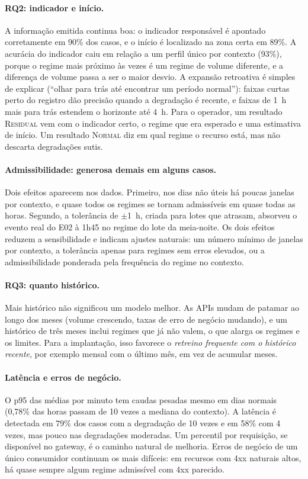 \documentclass[sigconf,nonacm]{acmart}
\newcommand{\Normal}{\textsc{Normal}\xspace}
\newcommand{\Residual}{\textsc{Residual}\xspace}
\begin{document}
\paragraph{RQ2: indicador e início.} A informação emitida continua boa: o indicador responsável é apontado corretamente em 90\% dos casos, e o início é localizado na zona certa em 89\%. A acurácia do indicador caiu em relação a um perfil único por contexto (93\%), porque o regime mais próximo às vezes é um regime de volume diferente, e a diferença de volume passa a ser o maior desvio. A expansão retroativa é simples de explicar (``olhar para trás até encontrar um período normal''): faixas curtas perto do registro dão precisão quando a degradação é recente, e faixas de 1~h mais para trás estendem o horizonte até 4~h. Para o operador, um resultado \Residual vem com o indicador certo, o regime que era esperado e uma estimativa de início. Um resultado \Normal diz em qual regime o recurso está, mas não descarta degradações sutis.

\paragraph{Admissibilidade: generosa demais em alguns casos.} Dois efeitos aparecem nos dados. Primeiro, nos dias não úteis há poucas janelas por contexto, e quase todos os regimes se tornam admissíveis em quase todas as horas. Segundo, a tolerância de $\pm$1~h, criada para lotes que atrasam, absorveu o evento real do E02 à 1h45 no regime do lote da meia-noite. Os dois efeitos reduzem a sensibilidade e indicam ajustes naturais: um número mínimo de janelas por contexto, a tolerância apenas para regimes sem erros elevados, ou a admissibilidade ponderada pela frequência do regime no contexto.

\paragraph{RQ3: quanto histórico.} Mais histórico não significou um modelo melhor. As APIs mudam de patamar ao longo dos meses (volume crescendo, taxas de erro de negócio mudando), e um histórico de três meses inclui regimes que já não valem, o que alarga os regimes e os limites. Para a implantação, isso favorece o \emph{retreino frequente com o histórico recente}, por exemplo mensal com o último mês, em vez de acumular meses.

\paragraph{Latência e erros de negócio.} O p95 das médias por minuto tem caudas pesadas mesmo em dias normais (0,78\% das horas passam de 10 vezes a mediana do contexto). A latência é detectada em 79\% dos casos com a degradação de 10 vezes e em 58\% com 4 vezes, mas pouco nas degradações moderadas. Um percentil por requisição, se disponível no gateway, é o caminho natural de melhoria. Erros de negócio de um único consumidor continuam os mais difíceis: em recursos com 4xx naturais altos, há quase sempre algum regime admissível com 4xx parecido.
\end{document}
